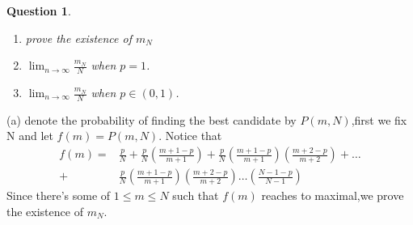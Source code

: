 \documentclass[a4paper,12pt]{article}
\newenvironment{prooff}{{\noindent\it\textcolor{cyan!40!black}{Proof}:}\quad}{\par}
\newtheorem{ques}{Question}
\begin{document}
\begin{prooff}
    \newpage
    \begin{ques}

        \begin{enumerate}
            \item prove the existence of $m_N$
            \item $\lim_{n\to \infty} \frac{m_N}{N} $ when $p=1$.
            \item $\lim_{n\to \infty} \frac{m_N}{N}$ when $p\in (0,1)$.
        \end{enumerate}
    \end{ques}
    (a) denote the probability of finding the best candidate by $P(m,N)$,first we fix N and let $f(m)=P(m,N)$.
    Notice that
    \begin{align*}
        f(m)= & \frac{p}{N}+\frac{p}{N}(\frac{m+1-p}{m+1})+\frac{p}{N}(\frac{m+1-p}{m+1})(\frac{m+2-p}{m+2})+\dots \\
        +     & \frac{p}{N}(\frac{m+1-p}{m+1})(\frac{m+2-p}{m+2})\dots (\frac{N-1-p}{N-1})
    \end{align*}
    Since there's some of $1\le m\le N$ such that $f(m)$ reaches to maximal,we prove the existence of $m_N$.


\end{prooff}
\end{document}
